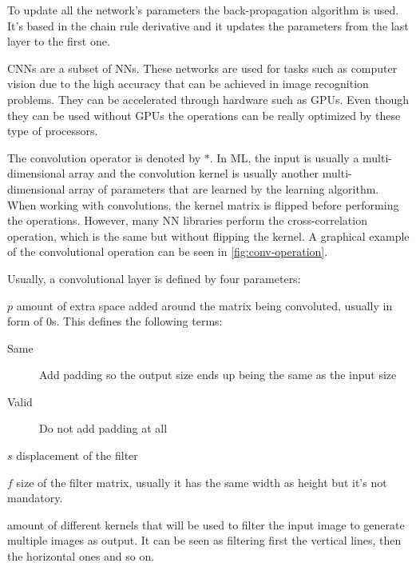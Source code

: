 To update all the network's parameters the back-propagation algorithm is used. It's based
in the chain rule derivative and it updates the parameters from the last layer to the first
one.
~\cite{neural:efficient-backprop}



\glspl{CNN} are a subset of \glspl{NN}. These networks are used for tasks such as 
computer vision due to the high accuracy that can be achieved in image recognition problems.
They can be accelerated through hardware such as \glspl{GPU}. Even though they can be used 
without \glspl{GPU} the operations can be really optimized by these type of processors. 

The convolution operator is denoted by \( * \). In \gls{ML}, the input is usually 
a multi-dimensional array and the convolution kernel is usually another multi-dimensional
array of parameters that are learned by the learning algorithm. When working with 
convolutions, the kernel matrix is flipped before performing the operations. However,
many \gls{NN} libraries perform the cross-correlation operation, which is the same
but without flipping the kernel. A graphical example of the convolutional operation 
can be seen in \autoref{fig:conv-operation}.
~\cite{neural:deeplearning-book}

Usually, a convolutional layer is defined by four parameters:
\begin{description}[topsep=0em]
  \item[Padding] \( p \) amount of extra space added around the matrix being convoluted, 
  usually in form of 0s. This defines the following terms:
  \begin{description}
    \item[Same] Add padding so the output size ends up being the same as the input size
    \item[Valid] Do not add padding at all
  \end{description}
  \item[Stride] \( s \) displacement of the filter
  \item[Filter size] \( f \) size of the filter matrix, usually it has the same width as height but
  it's not mandatory.
  \item[Number of filters] amount of different kernels that will be used to filter the input
  image to generate multiple images as output. It can be seen as filtering first the 
  vertical lines, then the horizontal ones and so on.
\end{description}

